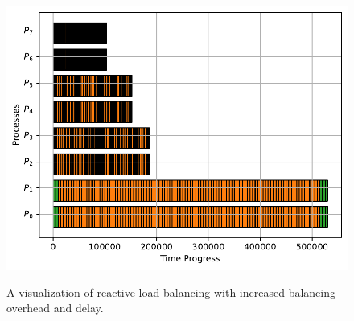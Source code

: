 \begin{figure}[t]
{\includegraphics[scale=0.525]{./pictures/poc_implementation/poc_visualize_reactlb_O10_d2_8_processes.pdf}
\label{sfig:reactlb_O10_d2}}
\caption{A visualization of reactive load balancing with increased balancing overhead and delay.}
\label{fig:simulator_reactlb_increased_O_d}
\end{figure}